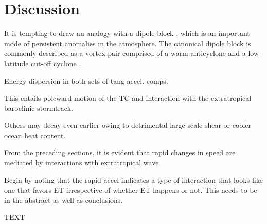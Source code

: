 \documentclass[wcd,manuscript]{copernicus}
\begin{document}
\section{Discussion}
It is tempting to draw an analogy with a dipole block \citep[e.g.,][]{MCW1980,PH2003}, which is an important mode of persistent anomalies in the atmosphere. The canonical dipole block is commonly described as a vortex pair comprised of a warm anticyclone and a low-latitude cut-off cyclone \citep[e.g.,][]{MBDAGE2006}. 

Energy dispersion in both sets of tang accel. comps.

 This entails poleward motion of the TC and interaction with the extratropical baroclinic stormtrack.

Others may decay even earlier owing to detrimental large scale shear or cooler ocean heat content. 


From the preceding sections, it is evident that rapid changes in speed are mediated by interactions with extratropical wave

Begin by noting that the rapid accel indicates a type of interaction that looks like one that favors ET irrespective of whether ET happens or not. This needs to be in the abstract as well as conclusions.




\conclusions  %
TEXT











\appendix
\section{}    %
\end{document}
